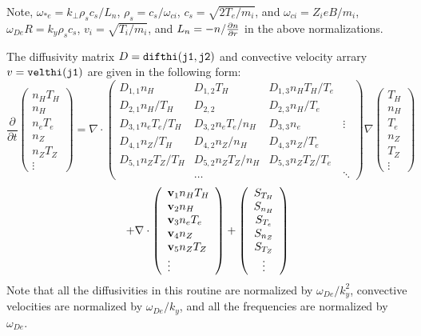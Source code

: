 Note, $ \omega_{*e} = k_\perp \rho_s c_s / L_n $,
$ \rho_s = c_s / \omega_{ci} $, $ c_s = \sqrt{ 2 T_e / m_i} $,
and $ \omega_{ci} = Z_i e B / m_i $, 
$ \omega_{De} R = k_y \rho_s c_s $,
$v_i = \sqrt{T_i / m_i}$, and $ L_n = - n / \frac{\partial n}{\partial r} $
in the above normalizations.

The diffusivity matrix $ D = {\tt difthi(j1,j2)}$
and convective velocity arrary $ v = {\tt velthi(j1)} $
are given in the following form:
$$ \frac{\partial}{\partial t}
 \left( \begin{array}{c} n_H T_H  \\ n_H \\ n_e T_e \\ 
    n_Z \\ n_Z T_Z \\ \vdots
    \end{array} \right)
 = \nabla \cdot
\left( \begin{array}{llll} 
D_{1,1} n_H & D_{1,2} T_H & D_{1,3} n_H T_H / T_e \\
D_{2,1} n_H / T_H & D_{2,2} & D_{2,3} n_H / T_e \\
D_{3,1} n_e T_e / T_H & D_{3,2} n_e T_e / n_H & D_{3,3} n_e & \vdots \\
D_{4,1} n_Z / T_H & D_{4,2} n_Z / n_H & D_{4,3} n_Z / T_e \\
D_{5,1} n_Z T_Z / T_H & D_{5,2} n_Z T_Z / n_H & 
        D_{5,3} n_Z T_Z / T_e \\
 & \ldots & & \ddots
\end{array} \right)
 \nabla
 \left( \begin{array}{c}  T_H \\ n_H \\  T_e \\ 
   n_Z \\  T_Z \\ \vdots
    \end{array} \right)
$$
$$
 + \nabla \cdot
\left( \begin{array}{l} {\bf v}_1 n_H T_H \\ {\bf v}_2 n_H \\
   {\bf v}_3 n_e T_e \\
   {\bf v}_4 n_Z \\ {\bf v}_5 n_Z T_Z \\ \vdots \end{array} \right) +
 \left( \begin{array}{c} S_{T_H} \\ S_{n_H} \\ S_{T_e} \\
    S_{n_Z} \\ S_{T_Z} \\ \vdots
    \end{array} \right) $$
Note that all the diffusivities in this routine are normalized by
$ \omega_{De} / k_y^2 $, 
convective velocities are normalized by $ \omega_{De} / k_y $, 
and all the frequencies are normalized by $ \omega_{De} $.













